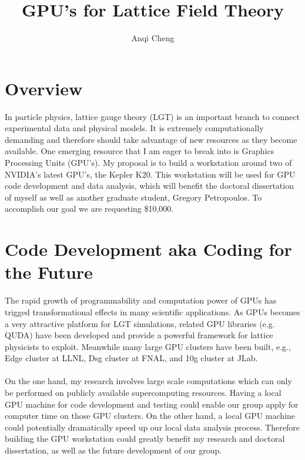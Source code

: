 \documentclass[11pt]{article}
\begin{document}
  \title{GPU's for Lattice Field Theory}
  \author{Anqi Cheng}
  \maketitle

  \section*{Overview} %
  In particle physics, lattice gauge theory (LGT) is an important branch to connect experimental data and physical models.
  It is extremely computationally demanding and therefore should take advantage of new  resources as they become available.
  One emerging resource that I am eager to break into is Graphics Processing Units (GPU's).   
  My proposal is to build a workstation around two of NVIDIA's latest GPU's, the Kepler K20.  
  This workstation will be used for GPU code development and data analysis, which will benefit the doctoral dissertation of myself as well as another graduate student, Gregory Petropoulos.  
  To accomplish our goal we are requesting \$10,000.  
  
   \section*{Code Development aka Coding for the Future} %
 The rapid growth of programmability and computation power of GPUs has trigged transformational effects in many scientific applications. As GPUs becomes 
 a very attractive platform for LGT simulations, related GPU libraries (e.g. QUDA) have been developed and  
 provide a powerful framework for lattice physicists to exploit. Meanwhile many large GPU clusters have been built, e.g., Edge cluster at LLNL,
 Dsg cluster at FNAL, and 10g cluster at JLab.\\\\
 On the one hand, my research involves large scale computations which can only be performed on publicly available supercomputing resources. Having a 
 local GPU machine for code development and testing could enable our group apply for computer time on those GPU clusters. On the other hand, a local 
 GPU machine could potentially dramatically speed up our local data analysis process. Therefore building the GPU workstation could greatly benefit my 
 research and doctoral dissertation, as well as the future development of our group.\\\\
\end{document}
